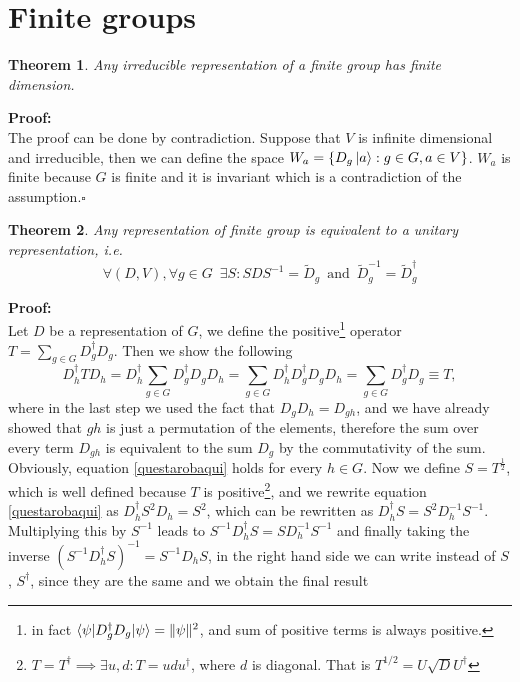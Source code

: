 \documentclass[12pt]{book}
\theoremstyle{plain}
\newtheorem{thm}{Theorem}[section]
\theoremstyle{definition}
\theoremstyle{remark}
\begin{document}
\section{Finite groups}
\begin{thm}
Any irreducible representation of a finite group has finite dimension.
\end{thm}
\hspace{-1.4em}\textbf{Proof:}\\
The proof can be done by contradiction. Suppose that $V$ is infinite dimensional and irreducible, then we can define the space $W_a = \{D_g \ket{a}:g\in G,a\in V\}$. $W_a$ is finite because $G$ is finite and it is invariant which is a contradiction of the assumption.\hfill\ensuremath{\square}
\begin{thm}\label{unitaryrepresentation}
Any representation of finite group is equivalent to a unitary representation, i.e.
\[\forall (D,V),\forall g\in G \,\,\, \exists S:SDS^{-1} = \widetilde{D}_g \,\,\,\text{and}\,\,\, \widetilde{D}_g^{-1} = \widetilde{D}_g^\dagger  \]
\end{thm}
\hspace{-1.4em}\textbf{Proof:}\\
Let $D$ be a representation of $G$, we define the positive\footnote{in fact $\braket{\psi|D^\dagger_gD_g|\psi}=\|\psi\|^2$, and sum of positive terms is always positive.} operator $T = \displaystyle\sum_{g\in G}D^\dagger_gD_g$. Then we show the following
\begin{equation}\label{questarobaqui}
D_h^\dagger T D_h = D_h^\dagger \sum_{g\in G} D_g^\dagger D_g D_h = \sum_{g\in G} D_h^\dagger D_g^\dagger D_gD_h = \sum_{g\in G} D_g^\dagger D_g  \equiv T,
\end{equation}
where in the last step we used the fact that $D_gD_h = D_{gh}$, and we have already showed that $gh$ is just a permutation of the elements, therefore the sum over every term $D_{gh}$ is equivalent to the sum $D_g$ by the commutativity of the sum. Obviously, equation \eqref{questarobaqui} holds for every $h\in G$. Now we define $S =T^{\frac{1}{2}}$, which is well defined because $T$ is positive\footnote{$T= T^\dagger\implies \exists u,d:T=udu^\dagger$, where $d$ is diagonal. That is $T^{1/2}=U\sqrt{D}U^\dagger$}, and we rewrite equation \eqref{questarobaqui}
as $D_h^\dagger S^2 D_h = S^2$, which can be rewritten as $D_h^\dagger S = S^2 D_h^{-1}S^{-1}$. Multiplying this by $S^{-1}$ leads to $S^{-1}D_h^\dagger S = SD_h^{-1}S^{-1}$ and finally taking the inverse $(S^{-1}D_h^\dagger S)^{-1} = S^{-1}D_hS$, in the right hand side we can write instead of $S$, $S^\dagger$, since they are the same and we obtain the final result
\end{document}
